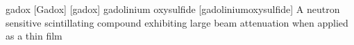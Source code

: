 \newglsXchemical%
{gadox}%
[Gadox]%
[gadox]%
{gadolinium oxysulfide}%
{}%
[gadoliniumoxysulfide]%
{A neutron sensitive scintillating compound exhibiting large beam attenuation when applied as a thin film}%